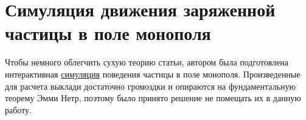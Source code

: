 \documentclass[a4paper, 12pt]{article}
\begin{document}













\section{Симуляция движения заряженной частицы в поле монополя}
Чтобы немного облегчить сухую теорию статьи, автором была подготовлена интерактивная \href{http://139.28.220.13:8501}{симуляция} поведения частицы в поле монополя. Произведенные для расчета выклади достаточно громоздки и опираются на фундаментальную теорему Эмми Нетр, поэтому было принято решение не помещать их в данную работу.
\end{document}
